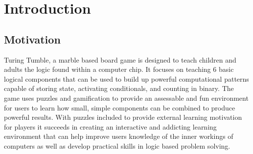 \documentclass{l4proj}
\begin{document}
%
%
%
%
%
%
%
%
\chapter{Introduction}


\section{Motivation}
Turing Tumble, a marble based board game is designed to teach children and adults the logic found within a computer chip. It focuses on teaching 6 basic logical components that can be used to build up powerful computational patterns capable of storing state, activating conditionals, and counting in binary. The game uses puzzles and gamification to provide an assessable and fun environment for users to learn how small, simple components can be combined to produce powerful results. With puzzles included to provide external learning motivation for players it succeeds in creating an interactive and addicting learning environment that can help improve users knowledge of the inner workings of computers as well as develop practical skills in logic based problem solving. 
\end{document}
